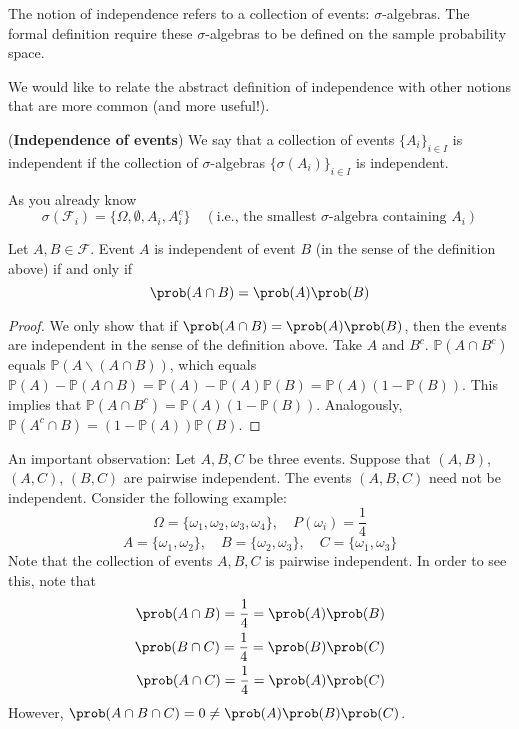 \documentclass[11pt]{article} %
\begin{document}
\noindent The notion of independence refers to a collection of events: $\sigma$-algebras. The formal definition require these $\sigma$-algebras to be defined on the sample probability space.

We would like to relate the abstract definition of independence with other notions that are more common (and more useful!). 

\begin{definition}(\textbf{Independence of events}) We say that a collection of events $\{A_i\}_{i \in I}$ is independent if the collection of $\sigma$-algebras $\{ \sigma(A_i)\}_{i \in I}$ is independent.  
\end{definition}

As you already know
\begin{equation*}
	\sigma(\mathcal{F}_i) = \{ \Omega, \emptyset, A_i, A_i^c\} \quad (\text{i.e., the smallest $\sigma$-algebra containing $A_i$})
\end{equation*}

\begin{proposition}
Let $A,B \in \mathcal{F}$. Event $A$ is independent of event $B$ (in the sense of the definition above) if and only if
$$\prob(A \cap B)=\prob(A)\prob(B) $$
\end{proposition}

\begin{proof}
We only show that if $\prob(A \cap B)=\prob(A)\prob(B)$, then the events are independent in the sense of the definition above. Take $A$ and $B^{c}$. $\mathbb{P}(A \cap B^c)$ equals $\mathbb{P}(A \backslash (A\cap B))$, which equals $\mathbb{P}(A)-\mathbb{P}(A \cap B) = \mathbb{P}(A)-\mathbb{P}(A)\mathbb{P}(B) = \mathbb{P}(A)(1-\mathbb{P}(B))$. This implies that $\mathbb{P}(A \cap B^c) = \mathbb{P}(A)(1-\mathbb{P}(B))$. Analogously, $\mathbb{P}(A^{c} \cap B) = (1-\mathbb{P}(A))\mathbb{P}(B)$.  
\end{proof}

An important observation: Let $A, B, C$ be three events. Suppose that $(A,B)$, $(A,C)$, $(B,C)$ are pairwise independent. The events $(A,B,C)$ need not be independent. Consider the following example:
\begin{equation*}
	\Omega=\{\omega_1, \omega_2, \omega_3, \omega_4\}, \quad P(\omega_i)=\frac{1}{4}
\end{equation*}
\begin{equation*}
	A= \{ \omega_1, \omega_2\}, \quad B= \{\omega_2, \omega_3\}, \quad C=\{\omega_1, \omega_3\}
\end{equation*}
	Note that the collection of events $A,B,C$ is pairwise independent. In order to see this, note that
\begin{eqnarray*}
\prob(A \cap B) = \frac{1}{4}= \prob(A) \prob(B)\\
\prob(B \cap C) = \frac{1}{4}= \prob(B) \prob(C)\\
\prob(A \cap C) = \frac{1}{4}= \prob(A) \prob(C)
\end{eqnarray*}
However, $\prob(A\cap B\cap C)= 0 \neq \prob(A)\prob(B)\prob(C)$. 
\end{document}
